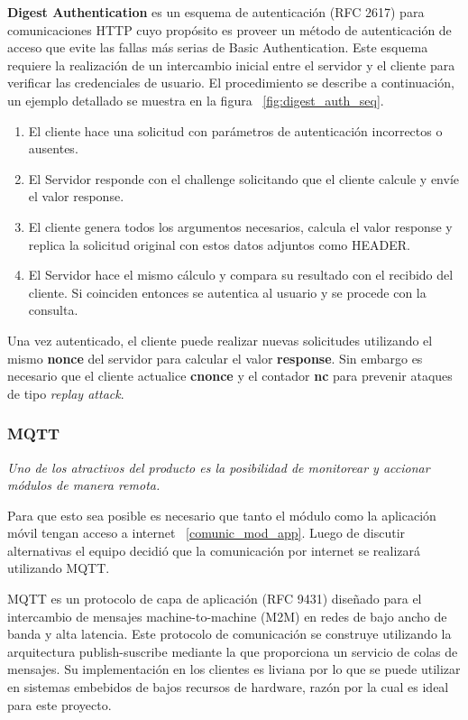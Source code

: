 \textbf{Digest Authentication} es un esquema de autenticación (RFC 2617) para comunicaciones HTTP cuyo propósito es proveer un método de autenticación de acceso que evite las fallas más serias de Basic Authentication.
Este esquema requiere la realización de un intercambio inicial entre el servidor y el cliente para verificar las credenciales de usuario. El procedimiento se describe a continuación, un ejemplo detallado se muestra en la figura ~\ref{fig:digest_auth_seq}.
\begin{enumerate}
	\item El cliente hace una solicitud con parámetros de autenticación incorrectos o ausentes.
	\item El Servidor responde con el challenge solicitando que el cliente calcule y envíe el valor  response.
	\item El cliente genera todos los argumentos necesarios, calcula el valor response y replica la solicitud original con estos datos adjuntos como HEADER.
	\item El Servidor hace el mismo cálculo y compara su resultado con el recibido del cliente. Si coinciden entonces se autentica al usuario y se procede con la consulta.
\end{enumerate}

Una vez autenticado, el cliente puede realizar nuevas solicitudes utilizando el mismo \textbf{nonce} del servidor para calcular el valor \textbf{response}. Sin embargo es necesario que el cliente actualice \textbf{cnonce} y el contador \textbf{nc} para prevenir ataques de tipo \emph{replay attack}. 

\subsubsection{MQTT}
\emph{Uno de los atractivos del producto es la posibilidad de monitorear y accionar módulos de manera remota.}

Para que esto sea posible es necesario que tanto el módulo como la aplicación móvil tengan acceso a internet ~\ref{comunic_mod_app}. Luego de discutir alternativas el equipo decidió que la comunicación por internet se realizará utilizando  MQTT.

MQTT es un protocolo de capa de aplicación (RFC 9431) diseñado para el intercambio de mensajes machine-to-machine (M2M) en redes de bajo ancho de banda y alta latencia. Este protocolo de comunicación se construye utilizando la arquitectura publish-suscribe mediante la que proporciona un servicio de colas de mensajes. Su implementación en los clientes es liviana por lo que se puede utilizar en sistemas embebidos de bajos recursos de hardware, razón por la cual es ideal para este proyecto.

